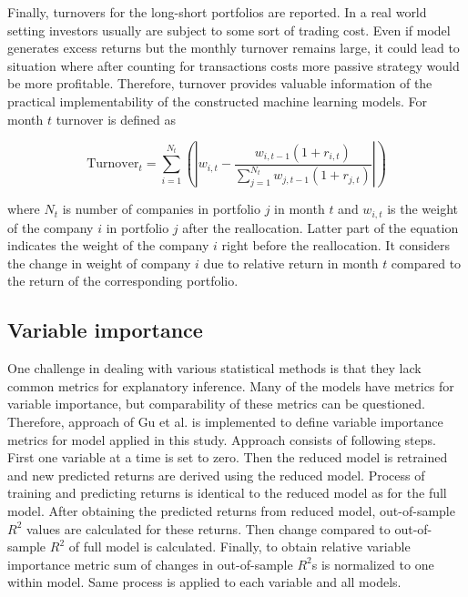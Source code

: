 \documentclass{article}
\begin{document}
Finally, turnovers for the long-short portfolios are reported. In a real world setting investors usually are subject to some sort of trading cost. Even if model generates excess returns but the monthly turnover remains large, it could lead to situation where after counting for transactions costs more passive strategy would be more profitable. Therefore, turnover provides valuable information of the practical implementability of the constructed machine learning models. For month $t$ turnover is defined as \par

\begin{equation}
\label{eq:Turnover}
\text{Turnover}_t = \sum_{i=1}^{N_t}  \left ( \left | w_{i, t} - \frac{w_{i, t-1}(1 + r_{i, t})}{ \sum_{j=1}^{N_{t}} w_{j, t-1}(1 + r_{j, t})} \right | \right )
\end{equation}

where $N_t$ is number of companies in portfolio $j$ in month $t$ and $w_{i, t}$ is the weight of the company $i$ in portfolio $j$ after the reallocation. Latter part of the equation indicates the weight of the company $i$ right before the reallocation. It considers the change in weight of company $i$ due to relative return in month $t$ compared to the return of the corresponding portfolio.

\subsection{Variable importance} \label{VariableImportance}

One challenge in dealing with various statistical methods is that they lack common metrics for explanatory inference. Many of the models have metrics for variable importance, but comparability of these metrics can be questioned. Therefore, approach of Gu et al. \citeyear{guetal} is implemented to define variable importance metrics for model applied in this study. Approach consists of following steps. First one variable at a time is set to zero. Then the reduced model is retrained and new predicted returns are derived using the reduced model. Process of training and predicting returns is identical to the reduced model as for the full model. After obtaining the predicted returns from reduced model, out-of-sample $R^2$ values are calculated for these returns. Then change compared to out-of-sample $R^2$ of full model is calculated. Finally, to obtain relative variable importance metric sum of changes in out-of-sample $R^2$s is normalized to one within model. Same process is applied to each variable and all models. \par
\end{document}
